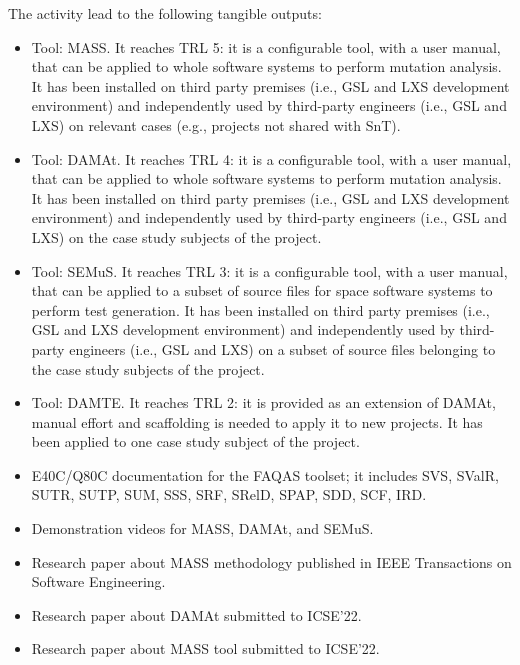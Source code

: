 The activity lead to the following tangible outputs:
\begin{itemize}
\item Tool: MASS. It reaches TRL 5: it is a configurable tool, with a user manual, that can be applied to whole software systems to perform mutation analysis. It has been installed on third party premises (i.e., GSL and LXS development environment)  and independently used by third-party engineers (i.e., GSL and LXS) on relevant cases (e.g., projects not shared with SnT).
\item Tool: DAMAt. It reaches TRL 4: it is a configurable tool, with a user manual, that can be applied to whole software systems to perform mutation analysis. It has been installed on third party premises (i.e., GSL and LXS development environment)  and independently used by third-party engineers (i.e., GSL and LXS) on the case study subjects of the project.
\item Tool: SEMuS. It reaches TRL 3: it is a configurable tool, with a user manual, that can be applied to a subset of source files for space software systems to perform test generation. It has been installed on third party premises (i.e., GSL and LXS development environment)  and independently used by third-party engineers (i.e., GSL and LXS) on a subset of source files belonging to the case study subjects of the project. 
\item Tool: DAMTE. It reaches TRL 2: it is provided as an extension of DAMAt, manual effort and scaffolding is needed to apply it to new projects. It has been applied to one case study subject of the project.
\item E40C/Q80C documentation for the FAQAS toolset; it includes SVS, SValR, SUTR, SUTP, SUM, SSS, SRF, SRelD, SPAP, SDD, SCF, IRD.
\item Demonstration videos for MASS, DAMAt, and SEMuS.
\item Research paper about MASS methodology published in IEEE Transactions on Software Engineering\cite{Oscar:MASS:TSE}.
\item Research paper about DAMAt submitted to ICSE'22.
\item Research paper about MASS tool submitted to ICSE'22.
\end{itemize}

\ENDCHANGEDWPT


